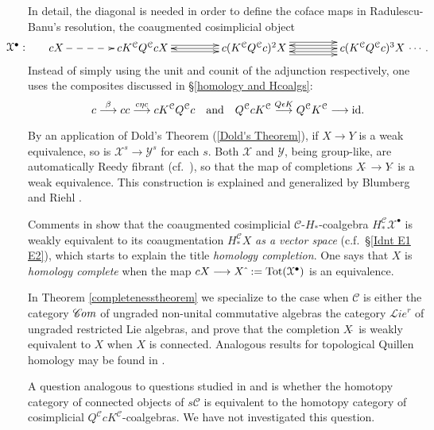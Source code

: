 \documentclass[11pt]{amsart} \renewcommand{\baselinestretch}{1.2}
\theoremstyle{plain}
\numberwithin{equation}{section} %
\theoremstyle{plain}
\numberwithin{equation}{chapter} %
\renewcommand{\to}{\longrightarrow}
\newcommand{\scrL}{\mathscr{L}}
\newcommand{\scrC}{\mathscr{C}}
\newcommand{\calY}{\mathcal{Y}}
\newcommand{\calx}{\mathcal{X}}
\newcommand{\calc}{\mathcal{C}}
\newcommand{\citeBOX}[2][]{\cite[\mbox{#1}]{#2}}
\newcommand{\algs}{{\scrC\!\textit{\normalfont\textit{om}}}}
\newcommand{\restliealgs}{{\scrL\!\textit{ie}^\textit{r}}}
\newcommand{\algcat}{{\calc}}%
\begin{document}
\begin{Pi-algebras and cohomology algebras}
In detail, the diagonal is needed in order  to define the coface maps in Radulescu-Banu's resolution, the coaugmented cosimplicial object
\[\makebox[0cm][r]{\,$\calx^\bullet:\qquad $}\vcenter{
\def\labelstyle{\scriptstyle}
\xymatrix@C=1.5cm@1{
cX\,
\ar@{-->}[r]
&
\,cK^{\calc}Q^{\calc}cX\,
\ar[r];[]
&
\,c(K^{\calc}Q^{\calc}c)^2X\,
\ar@<-.65ex>[l];[]
\ar@<+.65ex>[l];[]
\ar@<+.65ex>[r];[]
\ar@<-.65ex>[r];[]
&
\,c(K^{\calc}Q^{\calc}c)^3X\,\makebox[0cm][l]{\,$\cdots. $}
\ar[l];[]
\ar@<-1.3ex>[l];[]
\ar@<+1.3ex>[l];[]
}}\]
Instead of simply using the unit and counit of the adjunction respectively, one uses the composites discussed in \S\ref{homology and Hcoalgs}:
\[c\overset{\beta}{\to}cc\overset{c\eta c}{\to}cK^{\calc}Q^{\calc}c\textup{\quad and\quad }Q^{\calc}cK^{\calc}\overset{Q\epsilon K}{\to}Q^{\calc}K^{\calc}\to \textup{id}.\]

By an application of Dold's Theorem (\ref{Dold's Theorem}), if $X\to Y$ is a weak equivalence, so is $\calx^s\to\calY^s$ for each $s$. Both $\calx$ and $\calY$, being group-like,  are automatically Reedy fibrant (cf.\ \citeBOX[{X.4.9}]{YellowMonster}), so that the map of completions $X\hat{\ }\to Y\hat{\ }$ is a weak equivalence.
This construction is explained and generalized by Blumberg and Riehl \citeBOX[\S4]{BlumRiehlResolutions.pdf}.
 
Comments in \citeBOX[\S4]{BlumRiehlResolutions.pdf}  show that the coaugmented cosimplicial $\calc$-$H_*$-coalgebra $H_*^{\calc}\calx^\bullet$  is weakly equivalent to its coaugmentation $H_*^{\calc}X$ \emph{as a vector space} (c.f.\ \S\ref{Idnt E1 E2}), which starts to explain  the title \emph{homology completion}. One says that $X$ is \emph{homology complete} when the map $cX\to X\hat{\ }:=\textup{Tot}(\calx^\bullet)$ is an equivalence.

In Theorem \ref{completenesstheorem} we specialize to the case when $\algcat$ is either the category $\algs$  of ungraded non-unital commutative algebras the category $\restliealgs$ of ungraded restricted Lie algebras, and prove that the completion $X\hat{\ } $ is weakly equivalent to $X$ when $X$ is connected.
Analogous results for topological Quillen homology may be found in \cite{2015arXiv150206944C}. 

A question analogous to questions studied in \cite{2015arXiv150206944C} and \cite{2010arXiv1001.1556H} is whether the homotopy category of connected objects of $s\calc$ is equivalent to the homotopy category of cosimplicial $Q^\calc cK^\calc$-coalgebras. We have not investigated this question.


\end{Pi-algebras and cohomology algebras}
\end{document}
